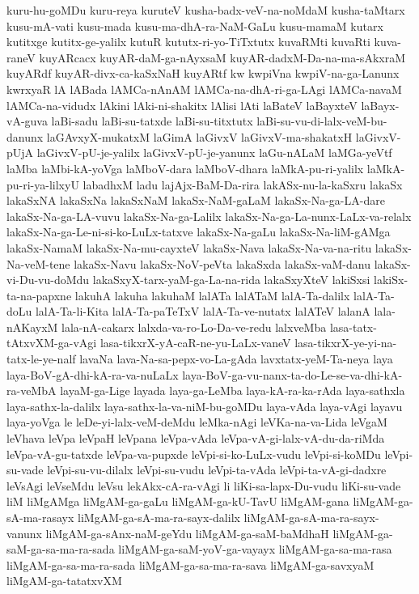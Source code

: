 {kuru-hu-goMDu
kuru-reya
kuruteV
kusha-badx-veV-na-noMdaM
kusha-taMtarx
kusu-mA-vati
kusu-mada
kusu-ma-dhA-ra-NaM-GaLu
kusu-mamaM
kutarx
kutitxge
kutitx-ge-yalilx
kutuR
kututx-ri-yo-TiTxtutx
kuvaRMti
kuvaRti
kuva-raneV
kuyARcacx
kuyAR-daM-ga-nAyxsaM
kuyAR-dadxM-Da-na-ma-sAkxraM
kuyARdf
kuyAR-divx-ca-kaSxNaH
kuyARtf
kw
kwpiVna
kwpiV-na-ga-Lanunx
kwrxyaR
lA
lABada
lAMCa-nAnAM
lAMCa-na-dhA-ri-ga-LAgi
lAMCa-navaM
lAMCa-na-vidudx
lAkini
lAki-ni-shakitx
lAlisi
lAti
laBateV
laBayxteV
laBayx-vA-guva
laBi-sadu
laBi-su-tatxde
laBi-su-titxtutx
laBi-su-vu-di-lalx-veM-bu-danunx
laGAvxyX-mukatxM
laGimA
laGivxV
laGivxV-ma-shakatxH
laGivxV-pUjA
laGivxV-pU-je-yalilx
laGivxV-pU-je-yanunx
laGu-nALaM
laMGa-yeVtf
laMba
laMbi-kA-yoVga
laMboV-dara
laMboV-dhara
laMkA-pu-ri-yalilx
laMkA-pu-ri-ya-lilxyU
labadhxM
ladu
lajAjx-BaM-Da-rira
lakASx-nu-la-kaSxru
lakaSx
lakaSxNA
lakaSxNa
lakaSxNaM
lakaSx-NaM-gaLaM
lakaSx-Na-ga-LA-dare
lakaSx-Na-ga-LA-vuvu
lakaSx-Na-ga-Lalilx
lakaSx-Na-ga-La-nunx-LaLx-va-relalx
lakaSx-Na-ga-Le-ni-si-ko-LuLx-tatxve
lakaSx-Na-gaLu
lakaSx-Na-liM-gAMga
lakaSx-NamaM
lakaSx-Na-mu-cayxteV
lakaSx-Nava
lakaSx-Na-va-na-ritu
lakaSx-Na-veM-tene
lakaSx-Navu
lakaSx-NoV-peVta
lakaSxda
lakaSx-vaM-danu
lakaSx-vi-Du-vu-doMdu
lakaSxyX-tarx-yaM-ga-La-na-rida
lakaSxyXteV
lakiSxsi
lakiSx-ta-na-papxne
lakuhA
lakuha
lakuhaM
lalATa
lalATaM
lalA-Ta-dalilx
lalA-Ta-doLu
lalA-Ta-li-Kita
lalA-Ta-paTeTxV
lalA-Ta-ve-nutatx
lalATeV
lalanA
lala-nAKayxM
lala-nA-cakarx
lalxda-va-ro-Lo-Da-ve-redu
lalxveMba
lasa-tatx-tAtxvXM-ga-vAgi
lasa-tikxrX-yA-caR-ne-yu-LaLx-vaneV
lasa-tikxrX-ye-yi-na-tatx-le-ye-nalf
lavaNa
lava-Na-sa-pepx-vo-La-gAda
lavxtatx-yeM-Ta-neya
laya
laya-BoV-gA-dhi-kA-ra-va-nuLaLx
laya-BoV-ga-vu-nanx-ta-do-Le-se-va-dhi-kA-ra-veMbA
layaM-ga-Lige
layada
laya-ga-LeMba
laya-kA-ra-ka-rAda
laya-sathxla
laya-sathx-la-dalilx
laya-sathx-la-va-niM-bu-goMDu
laya-vAda
laya-vAgi
layavu
laya-yoVga
le
leDe-yi-lalx-veM-deMdu
leMka-nAgi
leVKa-na-va-Lida
leVgaM
leVhava
leVpa
leVpaH
leVpana
leVpa-vAda
leVpa-vA-gi-lalx-vA-du-da-riMda
leVpa-vA-gu-tatxde
leVpa-va-pupxde
leVpi-si-ko-LuLx-vudu
leVpi-si-koMDu
leVpi-su-vade
leVpi-su-vu-dilalx
leVpi-su-vudu
leVpi-ta-vAda
leVpi-ta-vA-gi-dadxre
leVsAgi
leVseMdu
leVsu
lekAkx-cA-ra-vAgi
li
liKi-sa-lapx-Du-vudu
liKi-su-vade
liM
liMgAMga
liMgAM-ga-gaLu
liMgAM-ga-kU-TavU
liMgAM-gana
liMgAM-ga-sA-ma-rasayx
liMgAM-ga-sA-ma-ra-sayx-dalilx
liMgAM-ga-sA-ma-ra-sayx-vanunx
liMgAM-ga-sAnx-naM-geYdu
liMgAM-ga-saM-baMdhaH
liMgAM-ga-saM-ga-sa-ma-ra-sada
liMgAM-ga-saM-yoV-ga-vayayx
liMgAM-ga-sa-ma-rasa
liMgAM-ga-sa-ma-ra-sada
liMgAM-ga-sa-ma-ra-sava
liMgAM-ga-savxyaM
liMgAM-ga-tatatxvXM
}
